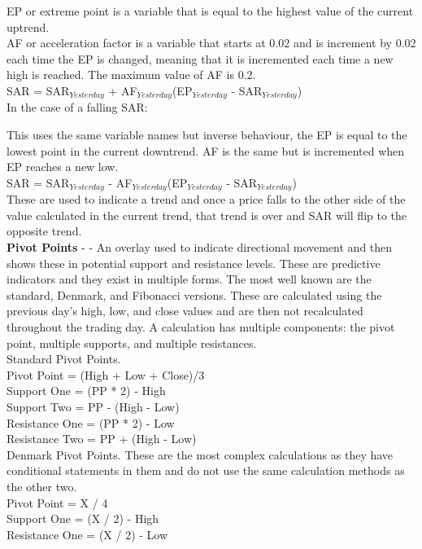 \documentclass[conference]{IEEEtran}
\begin{document}
\noindent
EP or extreme point is a variable that is equal to the highest value of the current uptrend.\\
AF or acceleration factor is a variable that starts at 0.02 and is increment by 0.02 each time the EP is changed, meaning that it is incremented each time a new high is reached. The maximum value of AF is 0.2. \\

\noindent
SAR = SAR$_{Yesterday}$ + AF$_{Yesterday}$(EP$_{Yesterday}$ - SAR$_{Yesterday}$) \\

\noindent
In the case of a falling SAR:

\noindent
This uses the same variable names but inverse behaviour, the EP is equal to the lowest point in the current downtrend. AF is the same but is incremented when EP reaches a new low. \\

\noindent
SAR = SAR$_{Yesterday}$ - AF$_{Yesterday}$(EP$_{Yesterday}$ - SAR$_{Yesterday}$) \\

\noindent
These are used to indicate a trend and once a price falls to the other side of the value calculated in the current trend, that trend is over and SAR will flip to the opposite trend. \\

\noindent
\textbf{Pivot Points} - \cite{Murphy1999} - An overlay used to indicate directional movement and then shows these in potential support and resistance levels. These are predictive indicators and they exist in multiple forms. The most well known are the standard, Denmark, and Fibonacci versions. These are calculated using the previous day's high, low, and close values and are then not recalculated throughout the trading day. A calculation has multiple components: the pivot point, multiple supports, and multiple resistances.\\

\noindent
Standard Pivot Points. \\
Pivot Point = (High + Low + Close)/3\\
Support One = (PP * 2) - High\\
Support Two = PP - (High - Low)\\
Resistance One = (PP * 2) - Low\\
Resistance Two = PP + (High - Low)\\

\noindent
Denmark Pivot Points. These are the most complex calculations as they have conditional statements in them and do not use the same calculation methods as the other two.\\
Pivot Point = X / 4\\
Support One = (X / 2) - High\\
Resistance One = (X / 2) - Low\\
\end{document}
